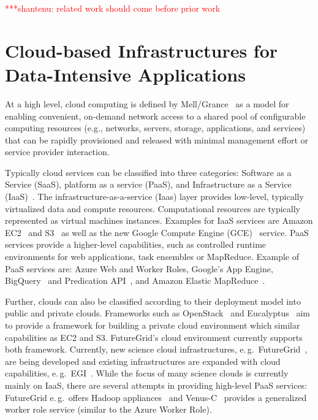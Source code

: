 \documentclass[times]{cpeauth}
\newcommand{\jhanote}[1]{ {\textcolor{red} { ***shantenu: #1 }}}
\newcommand{\jhanote}[1]{}
\begin{document}
\jhanote{related work should come before prior work}

\section{Cloud-based Infrastructures for Data-Intensive Applications}

At a high level, cloud computing is defined by Mell/Grance~\cite{nist_cloud}
as a model for enabling convenient, on-demand network access to a shared pool
of configurable computing resources (e.g., networks, servers, storage,
applications, and services) that can be rapidly provisioned and released with
minimal management effort or service provider interaction.


Typically cloud services can be classified into three categories: Software as
a Service (SaaS), platform as a service (PaaS), and Infrastructure as a
Service (IaaS)~\cite{Jha:2010kx}. The infrastructure-as-a-service (Iaas) layer
provides low-level, typically virtualized data and compute resources.
Computational resources are typically represented as virtual machines
instances. Examples for IaaS services are Amazon EC2~\cite{amazon_ec2} and
S3~\cite{amazons3} as well as the new Google Compute Engine (GCE)~\cite{gce}
service. PaaS services provide a higher-level capabilities, such as controlled
runtime environments for web applications, task ensembles or MapReduce.
Example of PaaS services are: Azure Web and Worker Roles, Google's App Engine,
BigQuery~\cite{google-bigquery} and Predication
API~\cite{google-predication-api}, and Amazon Elastic
MapReduce~\cite{amazonemr}.


% 


Further, clouds can also be classified according to their deployment model
into public and private clouds. Frameworks such as OpenStack~\cite{openstack}
and Eucalyptus~\cite{euca} aim to provide a framework for building a private
cloud environment which similar capabilities as EC2 and S3. FutureGrid's cloud
environment currently supports both framework. Currently, new science cloud
infrastructures, e.\,g.\ FutureGrid~\cite{futuregrid}, are being developed and
existing infrastructures are expanded with cloud capabilities, e.\,g.\
EGI~\cite{egi-cloud}. While the focus of many science clouds is currently
mainly on IaaS, there are several attempts in providing high-level PaaS
services: FutureGrid e.\,g.\ offers Hadoop appliances~\cite{2016793} and
Venus-C~\cite{venusc-generic-worker} provides a generalized worker role
service (similar to the Azure Worker Role).
\end{document}
